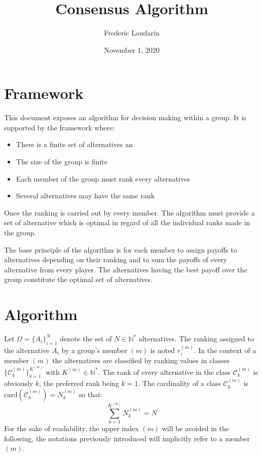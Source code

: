 \documentclass[12pt,a4paper]{article}
\begin{document}
\title{Consensus Algorithm}
\author{Frederic Laudarin}
\date{November 1, 2020}
\maketitle

\section{Framework}

This document exposes an algorithm for decision making within a group. It is supported by the framework where:
\begin{itemize}
\item There is a finite set of alternatives an
\item The size of the group is finite
\item Each member of the group must rank every alternatives
\item Several alternatives may have the same rank
\end{itemize}
Once the ranking is carried out by every member. The algorithm must provide a set of alternative which is optimal in regard of all the individual ranks made in the group.

The base principle of the algorithm is for each member to assign payoffs to alternatives depending on their ranking and to sum the payoffs of every alternative from every player. The alternatives having the best payoff over the group constitute the optimal set of alternatives.

\section{Algorithm}

Let $\Omega=\{A_i\}_{i=1}^N$ denote the set of $N\in\mathbb{N}^*$ alternatives. The ranking assigned to the alternative $A_i$ by a group's member $(m)$ is noted $r_i^{(m)}$. In the context of a member $(m)$ the alternatives are classified by ranking values in classes $\{\mathcal{C}_k^{(m)}\}_{k=1}^{K^{(m)}}$ with $K^{(m)}\in\mathbb{N}^*$. The rank of every alternative in the class $\mathcal{C}_k^{(m)}$ is obviously $k$, the preferred rank being $k=1$. The cardinality of a class $\mathcal{C}_k^{(m)}$ is $\mathrm{card}(\mathcal{C}_k^{(m)}) = N_k^{(m)}$ so that:
\begin{equation}
\sum_{k=1}^{K^{(m)}}{N_k^{(m)}} = N
\end{equation}
For the sake of readability, the upper index $(m)$ will be avoided in the following, the notations previously introduced will implicitly refer to a member $(m)$.
\end{document}
